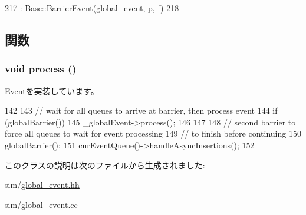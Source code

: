 \begin{DoxyCode}
217             : Base::BarrierEvent(global_event, p, f)
218         { }
\end{DoxyCode}


\subsection{関数}
\hypertarget{classGlobalSyncEvent_1_1BarrierEvent_a2e9c5136d19b1a95fc427e0852deab5c}{
\subsubsection[{process}]{\setlength{\rightskip}{0pt plus 5cm}void process ()}}
\label{classGlobalSyncEvent_1_1BarrierEvent_a2e9c5136d19b1a95fc427e0852deab5c}


\hyperlink{classEvent_a142b75b68a6291400e20fb0dd905b1c8}{Event}を実装しています。


\begin{DoxyCode}
142 {
143     // wait for all queues to arrive at barrier, then process event
144     if (globalBarrier()) {
145         _globalEvent->process();
146     }
147 
148     // second barrier to force all queues to wait for event processing
149     // to finish before continuing
150     globalBarrier();
151     curEventQueue()->handleAsyncInsertions();
152 }
\end{DoxyCode}


このクラスの説明は次のファイルから生成されました:\begin{DoxyCompactItemize}
\item 
sim/\hyperlink{global__event_8hh}{global\_\-event.hh}\item 
sim/\hyperlink{global__event_8cc}{global\_\-event.cc}\end{DoxyCompactItemize}
